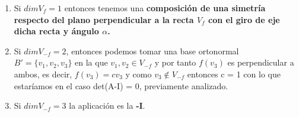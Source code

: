 \documentclass[10pt,a4paper]{article}
\theoremstyle{mystyle}
\begin{document}
\begin{enumerate}
\item Si $dimV_f = 1$ entonces tenemos una \textbf{composición de una simetría respecto del plano perpendicular a la recta $V_f$ con el giro de eje dicha recta y ángulo $\alpha$.}
\item Si $dimV_{-f} = 2$, entonces podemos tomar una base ortonormal $B' = \lbrace v_1,v_2,v_3 \rbrace$ en la que $v_1,v_2 \in V_{-f}$ y por tanto $f(v_3)$ es perpendicular a ambos, es decir, $f(v_3) = cv_3$ y como $v_3 \notin V_{-f}$ entonces c = 1 con lo que estaríamos en el caso det(A-I) = 0, previamente analizado.
\item Si $dimV_{-f} = 3$ la aplicación es la \textbf{-I}.
\end{enumerate}
\newpage
\nocite{*}


\end{document}
